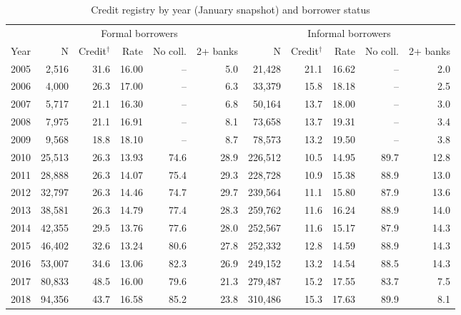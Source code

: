 \documentclass[12pt]{article}
\begin{document}
\begin{table}[htbp]
    \centering
    \caption{Credit registry by year (January snapshot) and borrower status}
    \label{tab:desc_by_year}
    \begin{threeparttable}
        \small
        \setlength{\tabcolsep}{3.5pt}
        \renewcommand{\arraystretch}{0.9}
        \begin{tabular}{l r r r r r r r r r r}
            \toprule
             & \multicolumn{5}{c}{Formal borrowers} & \multicolumn{5}{c}{Informal borrowers} \\
            \cmidrule(lr){2-6} \cmidrule(lr){7-11}
            Year & N & Credit$^{\dagger}$ & Rate & No coll. & 2+ banks & N & Credit$^{\dagger}$ & Rate & No coll. & 2+ banks \\
            \midrule
            2005 & 2,516 & 31.6 & 16.00 & -- & 5.0 & 21,428 & 21.1 & 16.62 & -- & 2.0 \\
            2006 & 4,000 & 26.3 & 17.00 & -- & 6.3 & 33,379 & 15.8 & 18.18 & -- & 2.5 \\
            2007 & 5,717 & 21.1 & 16.30 & -- & 6.8 & 50,164 & 13.7 & 18.00 & -- & 3.0 \\
            2008 & 7,975 & 21.1 & 16.91 & -- & 8.1 & 73,658 & 13.7 & 19.31 & -- & 3.4 \\
            2009 & 9,568 & 18.8 & 18.10 & -- & 8.7 & 78,573 & 13.2 & 19.50 & -- & 3.8 \\
            2010 & 25,513 & 26.3 & 13.93 & 74.6 & 28.9 & 226,512 & 10.5 & 14.95 & 89.7 & 12.8 \\
            2011 & 28,888 & 26.3 & 14.07 & 75.4 & 29.3 & 228,728 & 10.9 & 15.38 & 88.9 & 13.0 \\
            2012 & 32,797 & 26.3 & 14.46 & 74.7 & 29.7 & 239,564 & 11.1 & 15.80 & 87.9 & 13.6 \\
            2013 & 38,581 & 26.3 & 14.79 & 77.4 & 28.3 & 259,762 & 11.6 & 16.24 & 88.9 & 14.0 \\
            2014 & 42,355 & 29.5 & 13.76 & 77.6 & 28.0 & 252,567 & 11.6 & 15.17 & 87.9 & 14.3 \\
            2015 & 46,402 & 32.6 & 13.24 & 80.6 & 27.8 & 252,332 & 12.8 & 14.59 & 88.9 & 14.3 \\
            2016 & 53,007 & 34.6 & 13.06 & 82.3 & 26.9 & 249,152 & 13.2 & 14.54 & 88.5 & 14.3 \\
            2017 & 80,833 & 48.5 & 16.00 & 79.6 & 21.3 & 279,487 & 15.2 & 17.55 & 83.7 & 7.5 \\
            2018 & 94,356 & 43.7 & 16.58 & 85.2 & 23.8 & 310,486 & 15.3 & 17.63 & 89.9 & 8.1 \\

\end{tabular}
\end{threeparttable}
\end{table}
\end{document}
